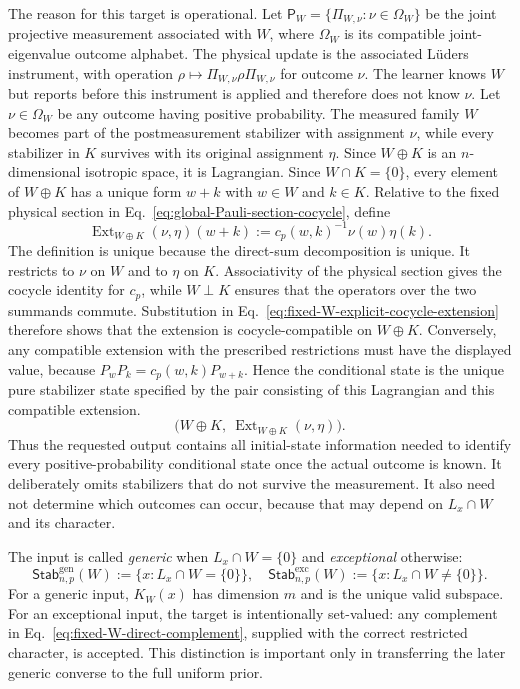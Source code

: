\documentclass[11pt]{article}
\newcommand{\1}{\mathbf 1}
\theoremstyle{plain}
\theoremstyle{definition}
\theoremstyle{remark}
\begin{document}
The reason for this target is operational.  Let
$\mathsf P_W=\{\Pi_{W,\nu}:\nu\in\Omega_W\}$ be the joint projective
measurement associated with $W$, where $\Omega_W$ is its compatible
joint-eigenvalue outcome alphabet.  The physical update is the associated
L\"uders instrument, with operation
$\rho\mapsto\Pi_{W,\nu}\rho\Pi_{W,\nu}$ for outcome $\nu$.  The learner
knows $W$ but reports before this instrument is applied and therefore does not
know $\nu$.  Let $\nu\in\Omega_W$ be any outcome having positive
probability.  The measured family $W$ becomes part of the postmeasurement
stabilizer with assignment $\nu$, while every stabilizer in $K$ survives with
its original assignment $\eta$.  Since $W\oplus K$ is an $n$-dimensional
isotropic space, it is Lagrangian.  Since $W\cap K=\{0\}$, every element of $W\oplus K$ has a unique
form $w+k$ with $w\in W$ and $k\in K$.  Relative to the fixed physical section
in Eq.~\eqref{eq:global-Pauli-section-cocycle}, define
\begin{equation}
 \operatorname{Ext}_{W\oplus K}(\nu,\eta)(w+k)
 :=c_p(w,k)^{-1}\nu(w)\eta(k).
 \label{eq:fixed-W-explicit-cocycle-extension}
\end{equation}
The definition is unique because the direct-sum decomposition is unique.  It
restricts to $\nu$ on $W$ and to $\eta$ on $K$.  Associativity of the physical
section gives the cocycle identity for $c_p$, while $W\perp K$ ensures that the
operators over the two summands commute.  Substitution in
Eq.~\eqref{eq:fixed-W-explicit-cocycle-extension} therefore shows that the
extension is cocycle-compatible on $W\oplus K$.  Conversely, any compatible
extension with the prescribed restrictions must have the displayed value,
because $P_wP_k=c_p(w,k)P_{w+k}$.  Hence the conditional state is the unique pure stabilizer state specified by
the pair consisting of this Lagrangian and this compatible extension.
\begin{equation}
 \bigl(W\oplus K,\ \operatorname{Ext}_{W\oplus K}(\nu,\eta)\bigr).
 \label{eq:fixed-W-postmeasurement-space}
\end{equation}
Thus the requested output contains all initial-state information needed to
identify every positive-probability conditional state once the actual outcome
is known.  It deliberately omits stabilizers that do not survive the
measurement.  It also need not determine which outcomes can occur, because
that may depend on $L_x\cap W$ and its character.

The input is called \emph{generic} when $L_x\cap W=\{0\}$ and
\emph{exceptional} otherwise:
\begin{equation}
 \mathsf{Stab}_{n,p}^{\mathrm{gen}}(W):=\{x:L_x\cap W=\{0\}\},\quad
 \mathsf{Stab}_{n,p}^{\mathrm{exc}}(W):=\{x:L_x\cap W\ne\{0\}\}.
 \label{eq:fixed-W-generic-exceptional}
\end{equation}
For a generic input, $K_W(x)$ has dimension $m$ and is the unique valid
subspace.  For an exceptional input, the target is intentionally
set-valued: any complement in Eq.~\eqref{eq:fixed-W-direct-complement}, supplied
with the correct restricted character, is accepted.  This distinction is
important only in transferring the later generic converse to the full uniform
prior.
\end{document}
